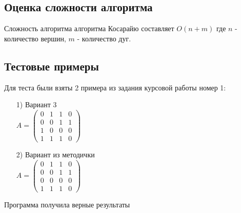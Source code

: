 \newpage
\subsection{Оценка сложности алгоритма}
Сложность алгоритма алгоритма Косарайю составляет $O(n + m)$ где $n$ - количество вершин, $m$ - количество дуг.
\subsection{Тестовые примеры}
Для теста были взяты 2 примера из задания курсовой работы номер 1:
\begin{enumerate}
    \item[1)] Вариант 3\\$A = \begin{pmatrix}
0 & 1 & 1 & 0\\
0 & 0 & 1 & 1\\
1 & 0 & 0 & 0\\
1 & 1 & 1 & 0
\end{pmatrix}$
\item[2)] Вариант из методички\\$A =\begin{pmatrix}
0 & 1 & 1 & 0\\
0 & 0 & 1 & 1\\
0 & 0 & 0 & 0\\
1 & 1 & 1 & 0
\end{pmatrix}$
\end{enumerate}
Программа получила верные результаты
